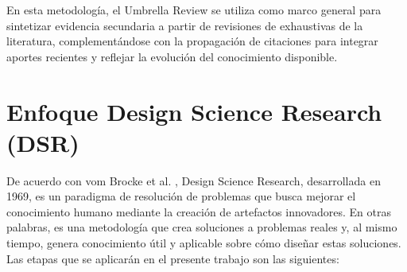 En esta metodología, el Umbrella Review se utiliza como marco general para sintetizar evidencia secundaria a partir de revisiones de exhaustivas de la literatura, 
complementándose 
con la propagación de citaciones para integrar aportes recientes y 
reflejar la evolución del conocimiento disponible.







\section{Enfoque Design Science Research (DSR)}
De acuerdo con vom Brocke et al. \textcite{vombrocke2020}, Design Science Research, desarrollada en 1969, es un paradigma de resolución de problemas que busca mejorar el conocimiento humano mediante la creación de artefactos innovadores. En otras palabras, es una metodología que crea soluciones a problemas reales y, al mismo tiempo, genera conocimiento útil y aplicable sobre cómo diseñar estas soluciones. Las etapas que se aplicarán en el presente trabajo son las siguientes:

